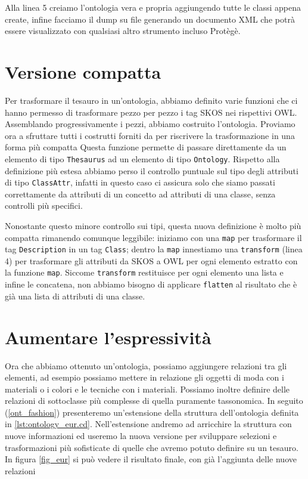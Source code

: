 Alla linea 5 creiamo l'ontologia vera e propria aggiungendo tutte le classi appena create, infine facciamo il dump su file generando un documento XML che potrà essere visualizzato con qualsiasi altro strumento incluso Protègè.
\section{Versione compatta}
Per trasformare il tesauro in un'ontologia, abbiamo definito varie funzioni che ci hanno permesso di trasformare pezzo per pezzo i tag SKOS nei rispettivi OWL. Assemblando progressivamente i pezzi, abbiamo costruito l'ontologia. Proviamo ora a sfruttare tutti i costrutti forniti da \cduce per riscrivere la trasformazione in una forma più compatta
Questa funzione permette di passare direttamente da un elemento di tipo \verb|Thesaurus| ad un elemento di tipo \verb|Ontology|. Rispetto alla definizione più estesa abbiamo perso il controllo puntuale sul tipo degli attributi di tipo \verb|ClassAttr|, infatti in questo caso \cduce ci assicura solo che siamo passati correttamente da attributi di un concetto ad attributi di una classe, senza controlli più specifici.

Nonostante questo minore controllo sui tipi, questa nuova definizione è molto più compatta rimanendo comunque leggibile: iniziamo con una \verb|map| per trasformare il tag \verb|Description| in un tag \verb|Class|; dentro la \verb|map| innestiamo una \verb|transform| (linea 4) per trasformare gli attributi da SKOS a OWL per ogni elemento estratto con la funzione \verb|map|. Siccome \verb|transform| restituisce per ogni elemento una lista e infine le concatena, non abbiamo bisogno di applicare \verb|flatten| al risultato che è già una lista di attributi di una classe.

\section{Aumentare l'espressività}\label{expr}
Ora che abbiamo ottenuto un'ontologia, possiamo aggiungere relazioni tra gli elementi, ad esempio possiamo mettere in relazione gli oggetti di moda con i materiali o i colori e le tecniche con i materiali. Possiamo inoltre definire delle relazioni di sottoclasse più complesse di quella puramente tassonomica.  In seguito (\ref{ont_fashion}) presenteremo un'estensione della struttura dell'ontologia definita in \ref{lst:ontology_eur.cd}. Nell'estensione andremo ad arricchire la struttura con nuove informazioni ed useremo la nuova versione per sviluppare selezioni e trasformazioni più sofisticate di quelle che avremo potuto definire su un tesauro. In figura \ref{fig_eur} si può vedere il risultato finale, con già l'aggiunta delle nuove relazioni

